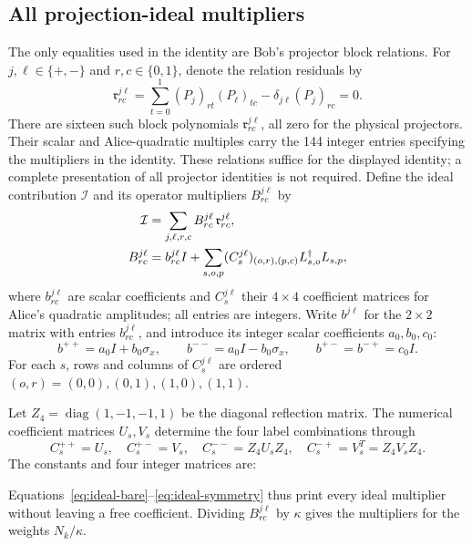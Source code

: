 \documentclass[11pt]{article}
\begin{document}
\subsection{All projection-ideal multipliers}
The only equalities used in the identity are Bob's projector block relations. For $j,\ell\in\{+,-\}$ and $r,c\in\{0,1\}$, denote the relation residuals by
\begin{equation}
 \mathfrak r^{j\ell}_{rc}=
   \sum_{t=0}^1(P_j)_{rt}(P_\ell)_{tc}
            -\delta_{j\ell}(P_j)_{rc}=0.
 \label{eq:ideal-relations}
\end{equation}
There are sixteen such block polynomials $\mathfrak r^{j\ell}_{rc}$, all zero for the physical projectors. Their scalar and Alice-quadratic multiples carry the 144 integer entries specifying the multipliers in the identity. These relations suffice for the displayed identity; a complete presentation of all projector identities is not required. Define the ideal contribution $\mathcal I$ and its operator multipliers $B^{j\ell}_{rc}$ by
\begin{align}
 \mathcal I&=\sum_{j,\ell,r,c}B^{j\ell}_{rc}\,\mathfrak r^{j\ell}_{rc},\notag\\
 B^{j\ell}_{rc}&=b^{j\ell}_{rc}I+
 \sum_{s,o,p}(C_s^{j\ell})_{(o,r),(p,c)}
                 L_{s,o}^\dagger L_{s,p},
 \label{eq:ideal-coefficients}
\end{align}
where $b^{j\ell}_{rc}$ are scalar coefficients and $C_s^{j\ell}$ their $4\times4$ coefficient matrices for Alice's quadratic amplitudes; all entries are integers. Write $b^{j\ell}$ for the $2\times2$ matrix with entries $b^{j\ell}_{rc}$, and introduce its integer scalar coefficients $a_0,b_0,c_0$:
\begin{equation}
 b^{++}=a_0I+b_0\sigma_x,\qquad b^{--}=a_0I-b_0\sigma_x,\qquad
 b^{+-}=b^{-+}=c_0I.
 \label{eq:ideal-bare}
\end{equation}
For each $s$, rows and columns of $C_s^{j\ell}$ are ordered $(o,r)=(0,0),(0,1),(1,0),(1,1)$.

Let $Z_4=\operatorname{diag}(1,-1,-1,1)$ be the diagonal reflection matrix. The numerical coefficient matrices $U_s,V_s$ determine the four label combinations through
\begin{equation}
 C_s^{++}=U_s,\quad C_s^{+-}=V_s,\quad
 C_s^{--}=Z_4U_sZ_4,\quad C_s^{-+}=V_s^T=Z_4V_sZ_4.
 \label{eq:ideal-symmetry}
\end{equation}
The constants and four integer matrices are:


Equations~\eqref{eq:ideal-bare}--\eqref{eq:ideal-symmetry} thus print every ideal multiplier without leaving a free coefficient. Dividing $B^{j\ell}_{rc}$ by $\kappa$ gives the multipliers for the weights $N_k/\kappa$.
\end{document}
